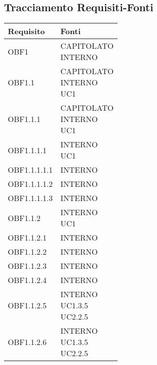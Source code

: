 \documentclass{scalatekids-article}
\begin{document}
\subsection{Tracciamento Requisiti-Fonti}
\begin{longtable}[H]{|p{5.5cm}|p{5.5cm}|}
  \hline
  \textbf{Requisito} & \textbf{Fonti}\\
  \hline
  OBF1 & \multiLineCell[t]{CAPITOLATO\\INTERNO\\}\\
  \hline
  OBF1.1 & \multiLineCell[t]{CAPITOLATO\\INTERNO\\UC1\\}\\
  \hline
  OBF1.1.1 & \multiLineCell[t]{CAPITOLATO\\INTERNO\\UC1\\}\\
  \hline
  OBF1.1.1.1 & \multiLineCell[t]{INTERNO\\UC1\\}\\
  \hline
  OBF1.1.1.1.1 & \multiLineCell[t]{INTERNO\\}\\
  \hline
  OBF1.1.1.1.2 & \multiLineCell[t]{INTERNO\\}\\
  \hline
  OBF1.1.1.1.3 & \multiLineCell[t]{INTERNO\\}\\
  \hline
  OBF1.1.2 & \multiLineCell[t]{INTERNO\\UC1\\}\\
  \hline
  OBF1.1.2.1 & \multiLineCell[t]{INTERNO\\}\\
  \hline
  OBF1.1.2.2 & \multiLineCell[t]{INTERNO\\}\\
  \hline
  OBF1.1.2.3 & \multiLineCell[t]{INTERNO\\}\\
  \hline
  OBF1.1.2.4 & \multiLineCell[t]{INTERNO\\}\\
  \hline
  OBF1.1.2.5 & \multiLineCell[t]{INTERNO\\UC1.3.5\\UC2.2.5\\}\\
  \hline
  OBF1.1.2.6 & \multiLineCell[t]{INTERNO\\UC1.3.5\\UC2.2.5\\}\\

\end{longtable}
\end{document}
